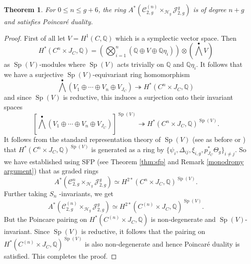 \documentclass[11pt]{amsart}
\newtheorem{theorem}{Theorem}[section]
\theoremstyle{definition}
\newcommand{\jac}{\mathcal{J}}
\newcommand{\h}{\mathcal{H}}
\newcommand{\mC}{\mathcal{C}}
\begin{document}
\begin{theorem}\label{thm:poincare-cnj}
    For $0\leq n\leq g+6$, the ring $A^*(\mC_{2,g}^{(n)}\times_{\h_g}\jac^g_{2,g})$ is of degree $n+g$ and satisfies Poincar\'e duality.
\end{theorem}
\begin{proof}

First of all let $V=H^1(C,\mathbb Q)$ which is a symplectic vector space. Then \begin{equation*}
    H^* (C^n \times J_C ,\mathbb Q) = \left ( \bigotimes_{i=1}^n \left ( \mathbb Q \oplus V \oplus \mathbb Q{\eta_i} \right ) \right )\otimes \left(\bigwedge^\bullet V \right)
\end{equation*} as $\operatorname{Sp}(V)$-modules where $\operatorname{Sp}(V)$ acts trivially on $\mathbb Q$ and $\mathbb Q\eta_i$. It follows that we have a surjective $\operatorname{Sp}(V)$-equivariant ring homomorphism \begin{equation*}
    \bigwedge^\bullet \left ( V_1\oplus \cdots \oplus V_n \oplus V_{J_C} \right ) \twoheadrightarrow  H^* (C^n \times J_C ,\mathbb Q)
 \end{equation*} and since $\operatorname{Sp}(V)$ is reductive, this induces a surjection onto their invariant spaces \begin{equation*}
     \left [\bigwedge^\bullet \left ( V_1\oplus \cdots \oplus V_n \oplus V_{J_C} \right ) \right ]^{\operatorname{Sp}(V)} \twoheadrightarrow  H^* (C^n \times J_C ,\mathbb Q)^{\operatorname{Sp}(V)}.
 \end{equation*}It follows from the standard representation theory of $\operatorname{Sp}(V)$ (see as before \cite{MR1488158} or \cite{MR986027}) that $ H^* (C^n \times J_C ,\mathbb Q)^{\operatorname{Sp}(V)}$ is generated as a ring by $ \big \{\psi_i, \Delta_{ij} ,\xi_{i,g}, p_{J_C}^*\Theta_g\big\}_{i\neq j} $. So we have established using SFP (see Theorem \ref{thm:sfp} and Remark \ref{monodromy argument}) that as graded rings \begin{equation*}
     A^* (\mC_{2,g}^{n}\times_{\h_g}\jac^g_{2,g}) \simeq  H^{2*} (C^n \times J_C ,\mathbb Q)^{\operatorname{Sp}(V)}.
 \end{equation*}
 Further taking $S_n$ -invariants, we get 
\begin{equation*}
      A^* (\mC_{2,g}^{(n)}\times_{\h_g}\jac^g_{2,g}) \simeq  H^{2*} (C^{(n)} \times J_C ,\mathbb Q)^{\operatorname{Sp}(V)}.
\end{equation*}
But the Poincare pairing on $ H^* (C^{(n)} \times J_C ,\mathbb Q)$ is non-degenerate and $\operatorname{Sp}(V)$-invariant. Since $\operatorname{Sp}(V)$ is reductive, it follows that the pairing on $ H^* (C^{(n)} \times J_C ,\mathbb Q)^{\operatorname{Sp}(V)}$ is also non-degenerate and hence Poincar\'e duality is satisfied. This completes the proof. 
\end{proof}
\end{document}
